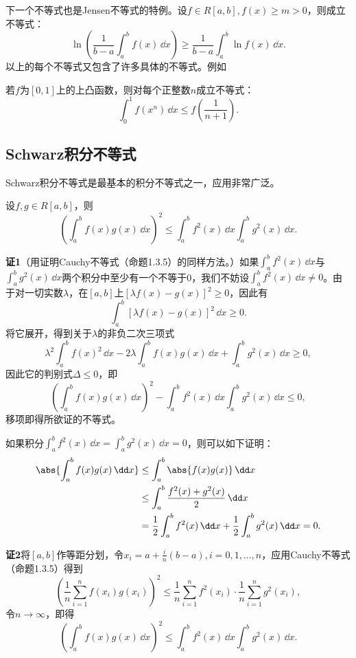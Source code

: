 下一个不等式也是Jensen不等式的特例。设$f\in R[a,b],f(x)\ge m>0$，则成立不等式：
\[
  \ln\left(\frac1{b-a}\int_a^bf(x)\,\dd x\right)
  \ge\frac1{b-a}\int_a^b\ln f(x)\,\dd x.
\]
以上的每个不等式又包含了许多具体的不等式。例如

\begin{xexample}[11.2.2]
若$f$为$[0,1]$上的上凸函数，则对每个正整数$n$成立不等式：
\[
  \int_0^1f(x^n)\,\dd x\le f\left(\frac1{n+1}\right).
\]
\end{xexample}

\subsection{Schwarz积分不等式}

Schwarz积分不等式是最基本的积分不等式之一，应用非常广泛。

\begin{xproposition}[11.2.2（Schwarz积分不等式）]
设$f,g\in R[a,b]$，则
\[
  \left(\int_a^bf(x)g(x)\,\dd x\right)^2
  \le\int_a^bf^2(x)\,\dd x\int_a^bg^2(x)\,\dd x.
\]
\end{xproposition}

\begin{xproof}
\textbf{证1}\quad （用证明Cauchy不等式（命题1.3.5）的同样方法。）如果$\int_a^bf^2(x)\,\dd x$与$\int_a^bg^2(x)\,\dd x$两个积分中至少有一个不等于0，我们不妨设$\int_a^bf^2(x)\,\dd x\ne0$。由于对一切实数$\lambda$，在$[a,b]$上$[\lambda f(x)-g(x)]^2\ge0$，因此有
\[
  \int_a^b[\lambda f(x)-g(x)]^2\,\dd x\ge0.
\]
将它展开，得到关于$\lambda$的非负二次三项式
\[
  \lambda^2\int_a^bf(x)^2\,\dd x-2\lambda\int_a^bf(x)g(x)\,\dd x+\int_a^bg^2(x)\,\dd x\ge0,
\]
因此它的判别式$\Delta\le0$，即
\[
  \left(\int_a^bf(x)g(x)\,\dd x\right)^2
  -\int_a^bf^2(x)\,\dd x\int_a^bg^2(x)\,\dd x\le0,
\]
移项即得所欲证的不等式。

如果积分$\int_a^bf^2(x)\,\dd x=\int_a^bg^2(x)\,\dd x=0$，则可以如下证明：
\begin{align*}
\abs{\int_a^bf(x)g(x)\,\dd x}
&\le\int_a^b\abs{f(x)g(x)}\,\dd x\\
&\le\int_a^b\frac{f^2(x)+g^2(x)}2\,\dd x\\
&=\frac12\int_a^bf^2(x)\,\dd x+\frac12\int_a^bg^2(x)\,\dd x=0.
\end{align*}

\textbf{证2}\quad 将$[a,b]$作等距分划，令$x_i=a+\frac in(b-a),i=0,1,\ldots,n$，应用Cauchy不等式（命题1.3.5）得到
\[
  \left(\frac1n\sum_{i=1}^nf(x_i)g(x_i)\right)^2
  \le\frac1n\sum_{i=1}^nf^2(x_i)\cdot\frac1n\sum_{i=1}^ng^2(x_i),
\]
令$n\to\infty$，即得
\[
  \left(\int_a^bf(x)g(x)\,\dd x\right)^2
  \le\int_a^bf^2(x)\,\dd x\int_a^bg^2(x)\,\dd x.
\]
\end{xproof}

